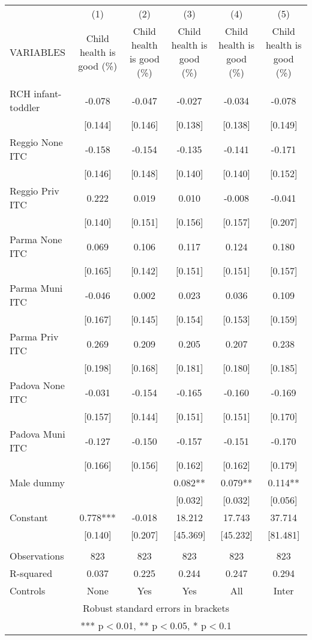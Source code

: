 \begin{tabular}{lccccc} \hline
 & (1) & (2) & (3) & (4) & (5) \\
VARIABLES & Child health is good (\%) & Child health is good (\%) & Child health is good (\%) & Child health is good (\%) & Child health is good (\%) \\ \hline
 &  &  &  &  &  \\
RCH infant-toddler & -0.078 & -0.047 & -0.027 & -0.034 & -0.078 \\
 & [0.144] & [0.146] & [0.138] & [0.138] & [0.149] \\
Reggio None ITC & -0.158 & -0.154 & -0.135 & -0.141 & -0.171 \\
 & [0.146] & [0.148] & [0.140] & [0.140] & [0.152] \\
Reggio Priv ITC & 0.222 & 0.019 & 0.010 & -0.008 & -0.041 \\
 & [0.140] & [0.151] & [0.156] & [0.157] & [0.207] \\
Parma None ITC & 0.069 & 0.106 & 0.117 & 0.124 & 0.180 \\
 & [0.165] & [0.142] & [0.151] & [0.151] & [0.157] \\
Parma Muni ITC & -0.046 & 0.002 & 0.023 & 0.036 & 0.109 \\
 & [0.167] & [0.145] & [0.154] & [0.153] & [0.159] \\
Parma Priv ITC & 0.269 & 0.209 & 0.205 & 0.207 & 0.238 \\
 & [0.198] & [0.168] & [0.181] & [0.180] & [0.185] \\
Padova None ITC & -0.031 & -0.154 & -0.165 & -0.160 & -0.169 \\
 & [0.157] & [0.144] & [0.151] & [0.151] & [0.170] \\
Padova Muni ITC & -0.127 & -0.150 & -0.157 & -0.151 & -0.170 \\
 & [0.166] & [0.156] & [0.162] & [0.162] & [0.179] \\
Male dummy &  &  & 0.082** & 0.079** & 0.114** \\
 &  &  & [0.032] & [0.032] & [0.056] \\
Constant & 0.778*** & -0.018 & 18.212 & 17.743 & 37.714 \\
 & [0.140] & [0.207] & [45.369] & [45.232] & [81.481] \\
 &  &  &  &  &  \\
Observations & 823 & 823 & 823 & 823 & 823 \\
R-squared & 0.037 & 0.225 & 0.244 & 0.247 & 0.294 \\
 Controls & None & Yes & Yes & All & Inter \\ \hline
\multicolumn{6}{c}{ Robust standard errors in brackets} \\
\multicolumn{6}{c}{ *** p$<$0.01, ** p$<$0.05, * p$<$0.1} \\
\end{tabular}
